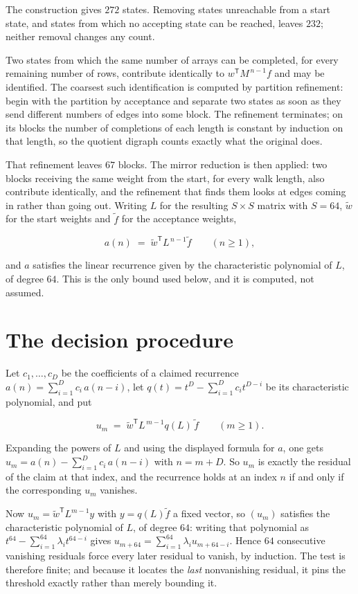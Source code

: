 \documentclass[11pt]{article}
\theoremstyle{definition}
\begin{document}
The construction gives $272$ states. Removing states unreachable from a start state, and states from which no accepting state can be reached, leaves $232$; neither removal changes any count.

Two states from which the same number of arrays can be completed, for every remaining number of rows, contribute identically to $w^{\mathsf T}M^{\,n-1}f$ and may be identified. The coarsest such identification is computed by partition refinement: begin with the partition by acceptance and separate two states as soon as they send different numbers of edges into some block. The refinement terminates; on its blocks the number of completions of each length is constant by induction on that length, so the quotient digraph counts exactly what the original does.

That refinement leaves $67$ blocks. The mirror reduction is then applied: two blocks receiving the same weight from the start, for every walk length, also contribute identically, and the refinement that finds them looks at edges coming in rather than going out. Writing $L$ for the resulting $S \times S$ matrix with $S = 64$, $\tilde w$ for the start weights and $\tilde f$ for the acceptance weights,

\[a(n) \;=\; \tilde w^{\mathsf T} L^{\,n-1} \tilde f \qquad (n \ge 1),\]

and $a$ satisfies the linear recurrence given by the characteristic polynomial of $L$, of degree $64$. This is the only bound used below, and it is computed, not assumed.

\section{The decision procedure}

Let $c_1,\dots,c_D$ be the coefficients of a claimed recurrence $a(n) = \sum_{i=1}^{D} c_i\,a(n-i)$, let $q(t) = t^{D} - \sum_{i=1}^{D} c_i t^{D-i}$ be its characteristic polynomial, and put

\[u_m \;=\; \tilde w^{\mathsf T} L^{\,m-1} q(L)\,\tilde f \qquad (m \ge 1).\]

Expanding the powers of $L$ and using the displayed formula for $a$, one gets $u_m = a(n) - \sum_{i=1}^{D} c_i\,a(n-i)$ with $n = m + D$. So $u_m$ is exactly the residual of the claim at that index, and the recurrence holds at an index $n$ if and only if the corresponding $u_m$ vanishes.

Now $u_m = \tilde w^{\mathsf T} L^{m-1} y$ with $y = q(L)\tilde f$ a fixed vector, so $(u_m)$ satisfies the characteristic polynomial of $L$, of degree $64$: writing that polynomial as $t^{64} - \sum_{i=1}^{64} \lambda_i t^{64-i}$ gives $u_{m+64} = \sum_{i=1}^{64} \lambda_i u_{m+64-i}$. Hence $64$ consecutive vanishing residuals force every later residual to vanish, by induction. The test is therefore finite; and because it locates the {\itshape last} nonvanishing residual, it pins the threshold exactly rather than merely bounding it.
\end{document}
